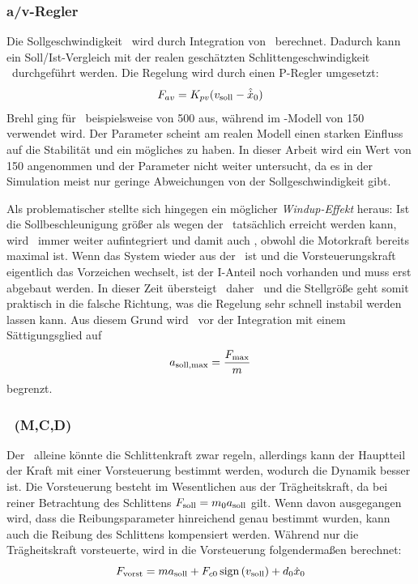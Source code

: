 \subsubsection{a/v-Regler}
Die Sollgeschwindigkeit \vsoll\ wird durch Integration von \asoll\ berechnet.
Dadurch kann ein Soll/Ist-Vergleich mit der realen \bzw geschätzten Schlittengeschwindigkeit \xop\ durchgeführt werden.
Die Regelung wird durch einen P-Regler umgesetzt:
	\[
	F_{av}= K_{pv} (v_{\mathrm{soll}}-\hat{\dot{x}}_0)
\]
Brehl \cite{brehl} ging für \kpv\ beispielsweise von 500 aus, während im \sm-Modell von \cite{chang} 150 verwendet wird.
Der Parameter scheint am realen Modell einen starken Einfluss auf die Stabilität und ein mögliches  zu haben.
In dieser Arbeit wird ein Wert von 150 angenommen und der Parameter nicht weiter untersucht, da es in der Simulation meist nur geringe Abweichungen von der Sollgeschwindigkeit gibt.

Als problematischer stellte sich hingegen ein möglicher \emph{Windup-Effekt} heraus: 
Ist die Sollbeschleunigung größer als wegen der \sgb\ tatsächlich erreicht werden kann, wird \vsoll\ immer weiter aufintegriert und damit auch \fav, obwohl die Motorkraft bereits maximal ist. 
Wenn das System wieder aus der \sgb\ ist und die Vorsteuerungskraft eigentlich das Vorzeichen wechselt, ist der I-Anteil noch vorhanden und muss erst abgebaut werden.
In dieser Zeit übersteigt \fav\ daher \fvorst\ und die Stellgröße geht somit praktisch in die falsche Richtung, was die Regelung sehr schnell instabil werden lassen kann.
Aus diesem Grund wird \asoll\ vor der Integration mit einem Sättigungsglied auf 
	\[
	a_{\mathrm{soll,max}}=\frac{F_{\mathrm{max}}}{m}
\] 
begrenzt.

\subsubsection{\vorst\  (M,C,D)}\label{sec:vorstmcd}
Der \avr\ alleine könnte die Schlittenkraft zwar regeln, allerdings kann der Hauptteil der Kraft mit einer Vorsteuerung bestimmt werden, wodurch die Dynamik besser ist.
Die Vorsteuerung besteht im Wesentlichen aus der Trägheitskraft, da bei reiner Betrachtung des Schlittens $F_{\mathrm{soll}}=m_0 a_{\mathrm{soll}}$ gilt. 
Wenn davon ausgegangen wird, dass die Reibungsparameter hinreichend genau bestimmt wurden, kann auch die Reibung des Schlittens kompensiert werden.
Während \cite{brehl} nur die Trägheitskraft vorsteuerte, wird in \cite{chang} die Vorsteuerung folgendermaßen berechnet:
	\[
	F_{\mathrm{vorst}}=m a_{\mathrm{soll}} + F_{c0} \, \mathrm{sign}\left(v_{\mathrm{soll}}\right) + d_0 \dot{x}_0
\]

